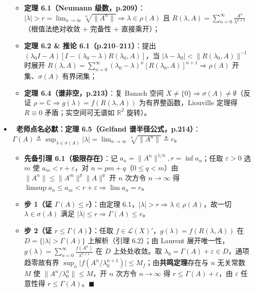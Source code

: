 \documentclass[11pt,a4paper]{article}
\providecommand{\tightlist}{\setlength{\itemsep}{1.8pt}\setlength{\parskip}{0pt}}
\newcommand{\WarnBadge}{%
  \tcbox[on line, colback=CoralSoft, colframe=CoralMain!45!BorderColor, boxrule=0.35pt,
    arc=3pt, left=3.5pt, right=3.5pt, top=0.5pt, bottom=0.5pt, boxsep=0pt]{\scriptsize\bfseries\color{CoralMain}注意}\,%
}
\begin{document}
\begin{itemize}
  \begin{itemize}
  \tightlist
  \item
    \textbf{定理 6.1（Neumann 级数，p.209）}：\(\lvert\lambda\rvert>r=\lim_{n\to\infty}\sqrt[n]{\lVert A^n\rVert}\Rightarrow\lambda\in\rho(A)\) 且 \(R(\lambda,A)=\sum_{n=0}^\infty\frac{A^n}{\lambda^{n+1}}\)（根值法绝对收敛 + 完备性 + 直接乘开）；
  \item
    \textbf{定理 6.2 \& 推论 6.1（p.210--211）}：提出 \((\lambda_0 I-A)[I-(\lambda_0-\lambda)R(\lambda_0,A)]\)，当 \(\lvert\lambda-\lambda_0\rvert<\lVert R(\lambda_0,A)\rVert^{-1}\) 时展开 \(R(\lambda,A)=\sum_{n=0}^\infty(\lambda_0-\lambda)^n[R(\lambda_0,A)]^{n+1}\Rightarrow\rho(A)\) 开集、\(\sigma(A)\) 有界闭集；
  \item
    \textbf{定理 6.4（谱非空，p.213）}：复 Banach 空间 \(X\neq\{0\}\Rightarrow\sigma(A)\neq\emptyset\)（反证 \(\rho=\mathbb{C}\Rightarrow g(\lambda)=f(R(\lambda,A))\) 为有界整函数，Liouville 定理得 \(R\equiv 0\) 矛盾；实空间可无谱如 \(\mathbb{R}^2\) 旋转）。
  \end{itemize}
\item
  \textbf{\WarnBadge{} 老师点名必默：定理 6.5（Gelfand 谱半径公式，p.214）}：\(\Gamma(A)\triangleq\sup_{\lambda\in\sigma(A)}\lvert\lambda\rvert=\lim_{n\to\infty}\sqrt[n]{\lVert A^n\rVert}\triangleq r\)。

  \begin{itemize}
  \tightlist
  \item
    \textbf{先备引理 6.1（极限存在）}：记 \(a_n=\lVert A^n\rVert^{1/n}, r=\inf a_n\)；任取 \(\varepsilon>0\) 选 \(m\) 使 \(a_m<r+\varepsilon\)，对 \(n=pm+q\)（\(0\le q<m\)）由 \(\lVert A^n\rVert\le\lVert A^m\rVert^p\lVert A\rVert^q\) 开 \(n\) 次方令 \(n\to\infty\) 得 \(\limsup a_n\le a_m<r+\varepsilon\Rightarrow\lim a_n=r\)。
  \item
    \textbf{步 1（证 \(\Gamma(A)\le r\)）}：由定理 6.1，\(\lvert\lambda\rvert>r\Rightarrow\lambda\in\rho(A)\)，故一切 \(\lambda\in\sigma(A)\) 满足 \(\lvert\lambda\rvert\le r\Rightarrow\Gamma(A)\le r\)。
  \item
    \textbf{步 2（证 \(r\le\Gamma(A)\)）}：任取 \(f\in\mathcal{L}(X)'\)，\(g(\lambda)=f(R(\lambda,A))\) 在 \(D=\{\lvert\lambda\rvert>\Gamma(A)\}\) 上解析（引理 6.2）；由 Laurent 展开唯一性，\(g(\lambda)=\sum_{n=0}^\infty\frac{f(A^n)}{\lambda^{n+1}}\) 在 \(D\) 上处处收敛。取 \(\lambda_0=\Gamma(A)+\varepsilon\in D\)，通项趋零故有界 \(\sup_n\lvert f(A^n/\lambda_0^{n+1})\rvert\le M_f\)；由\textbf{共鸣定理}存在与 \(n\) 无关常数 \(M\) 使 \(\lVert A^n/\lambda_0^n\rVert\le M\)，开 \(n\) 次方令 \(n\to\infty\) 得 \(r\le\Gamma(A)+\varepsilon\)，由 \(\varepsilon\) 任意性得 \(r\le\Gamma(A)\)。\(\blacksquare\)
  \end{itemize}
\end{itemize}
\end{document}
